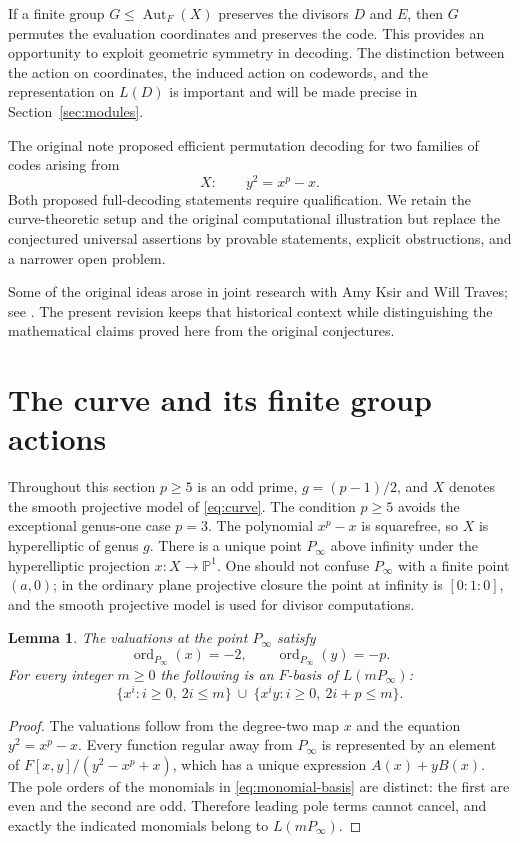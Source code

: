 \documentclass[12pt]{article}
\newtheorem{lemma}[theorem]{Lemma}
\numberwithin{equation}{section}
\newcommand{\PP}{\mathbb{P}}
\newcommand{\Aut}{\operatorname{Aut}}
\begin{document}
If a finite group $G\leq\Aut_F(X)$ preserves the divisors $D$ and $E$,
then $G$ permutes the evaluation coordinates and preserves the code.
This provides an opportunity to exploit geometric symmetry in decoding.
The distinction between the action on coordinates, the induced action on
codewords, and the representation on $L(D)$ is important and will be made
precise in Section~\ref{sec:modules}.

The original note proposed efficient permutation decoding for two families
of codes arising from
\begin{equation}\label{eq:curve}
X:\qquad y^2=x^p-x.
\end{equation}
Both proposed full-decoding statements require qualification.  We retain
the curve-theoretic setup and the original computational illustration but
replace the conjectured universal assertions by provable statements,
explicit obstructions, and a narrower open problem.

Some of the original ideas arose in joint research with Amy Ksir and
Will Traves; see \cite{JK1,JK2,JT}.  The present revision keeps that
historical context while distinguishing the mathematical claims
proved here from the original conjectures.

\section{The curve and its finite group actions}\label{sec:curve}
Throughout this section $p\geq5$ is an odd prime, $g=(p-1)/2$,
and $X$ denotes the smooth projective model of \eqref{eq:curve}.
The condition $p\geq5$ avoids the exceptional genus-one case $p=3$.
The polynomial $x^p-x$ is squarefree, so $X$ is hyperelliptic of genus $g$.
There is a unique point $P_\infty$ above infinity under the
hyperelliptic projection $x:X\to\PP^1$.
One should not confuse $P_\infty$ with a finite point $(a,0)$;
in the ordinary plane projective closure the point at infinity is
$[0:1:0]$, and the smooth projective model is used for divisor
computations.

\begin{lemma}\label{lem:poles}
The valuations at the point $P_\infty$ satisfy
\[
\operatorname{ord}_{P_\infty}(x)=-2,\qquad
\operatorname{ord}_{P_\infty}(y)=-p.
\]
For every integer $m\geq0$ the following is an $F$-basis of
$L(mP_\infty)$:
\begin{equation}\label{eq:monomial-basis}
\{x^i:i\geq0,\ 2i\leq m\}\ \cup\
\{x^iy:i\geq0,\ 2i+p\leq m\}.
\end{equation}
\end{lemma}
\begin{proof}
The valuations follow from the degree-two map $x$ and the equation
$y^2=x^p-x$.  Every function regular away from $P_\infty$ is
represented by an element of $F[x,y]/(y^2-x^p+x)$, which has a unique
expression $A(x)+yB(x)$.  The pole orders of the monomials in
\eqref{eq:monomial-basis} are distinct: the first are even and the
second are odd.  Therefore leading pole terms cannot cancel, and
exactly the indicated monomials belong to $L(mP_\infty)$.
\end{proof}
\end{document}
